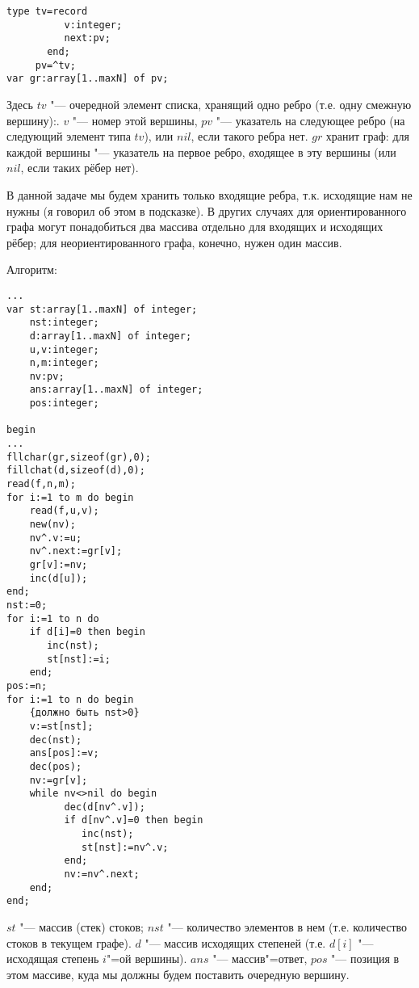 \begin{codesample}\begin{verbatim}
type tv=record
          v:integer;
          next:pv;
       end;
     pv=^tv;
var gr:array[1..maxN] of pv;
\end{verbatim}
\end{codesample}
Здесь $tv$ "--- очередной элемент списка, хранящий одно ребро (т.е. одну смежную вершину):. $v$ "---
номер этой вершины, $pv$ "--- указатель на следующее ребро (на следующий элемент типа $tv$), или $nil$,
если такого ребра нет.
$gr$ хранит граф: для каждой вершины "--- указатель на первое ребро, \textit{в}ходящее в эту вершины (или $nil$,
если таких рёбер нет).

В данной задаче мы будем хранить только входящие ребра, т.к. исходящие нам не нужны (я говорил об этом
в подсказке). В других случаях для ориентированного графа могут понадобиться два массива отдельно для
входящих и исходящих рёбер; для неориентированного графа, конечно, нужен один массив.

Алгоритм:
\begin{codesamplec}{3}\begin{verbatim}
...
var st:array[1..maxN] of integer;
    nst:integer;
    d:array[1..maxN] of integer;
    u,v:integer;
    n,m:integer;
    nv:pv;
    ans:array[1..maxN] of integer;
    pos:integer;
    
begin
...
fllchar(gr,sizeof(gr),0);
fillchat(d,sizeof(d),0);
read(f,n,m);
for i:=1 to m do begin
    read(f,u,v);
    new(nv);
    nv^.v:=u;
    nv^.next:=gr[v];
    gr[v]:=nv;
    inc(d[u]);
end;
nst:=0;
for i:=1 to n do
    if d[i]=0 then begin
       inc(nst);
       st[nst]:=i;
    end;
pos:=n;
for i:=1 to n do begin
    {должно быть nst>0}
    v:=st[nst];
    dec(nst);
    ans[pos]:=v;
    dec(pos);
    nv:=gr[v];
    while nv<>nil do begin
          dec(d[nv^.v]);
          if d[nv^.v]=0 then begin
             inc(nst);
             st[nst]:=nv^.v;
          end;
          nv:=nv^.next;
    end;
end;
\end{verbatim}
\end{codesamplec}
$st$ "--- массив (стек) стоков; $nst$ "--- количество элементов в нем (т.е. количество стоков в текущем графе).
$d$ "--- массив исходящих степеней (т.е. $d[i]$ "--- исходящая степень $i$"=ой вершины). $ans$ "--- массив"=ответ,
$pos$ "--- позиция в этом массиве, куда мы должны будем поставить очередную вершину.

